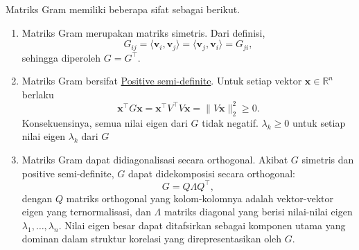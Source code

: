 Matriks Gram memiliki beberapa sifat sebagai berikut.
\begin{enumerate}
    \item Matriks Gram merupakan matriks simetris. Dari definisi,
    \[
        G_{ij} = \langle \mathbf{v}_i, \mathbf{v}_j \rangle
        = \langle \mathbf{v}_j, \mathbf{v}_i \rangle = G_{ji},
    \]
    sehingga diperoleh $G = G^\top$.

\item Matriks Gram bersifat \href{https://en.wikipedia.org/wiki/Definite_matrix}{Positive semi-definite}.
    Untuk setiap vektor $\mathbf{x} \in \mathbb{R}^n$ berlaku
    $$
        \mathbf{x}^\top G \mathbf{x}
        = \mathbf{x}^\top V^\top V \mathbf{x}
        = \| V \mathbf{x} \|_2^2 \geq 0.
    $$
    Konsekuensinya, semua nilai eigen dari $G$ tidak negatif. $\lambda_k \ge 0$ untuk setiap nilai eigen $\lambda_k$ dari $G$

    \item Matriks Gram dapat didiagonalisasi secara orthogonal. Akibat $G$ simetris dan positive semi-definite, $G$ dapat didekomposisi secara orthogonal:
    $$
        G = Q \Lambda Q^\top,
    $$
    dengan $Q$ matriks orthogonal yang kolom-kolomnya adalah vektor-vektor eigen yang ternormalisasi, dan $\Lambda$ matriks diagonal yang berisi nilai-nilai eigen $\lambda_1, \ldots, \lambda_n$. Nilai eigen besar dapat ditafsirkan sebagai komponen utama yang dominan dalam struktur korelasi yang direpresentasikan oleh $G$.
\end{enumerate}
